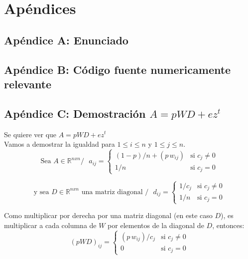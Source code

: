 \section{Apéndices}

	\subsection{Apéndice A: Enunciado}

	\subsection{Apéndice B: Código fuente numericamente relevante}
	\clearpage

	\subsection{Apéndice C: Demostración $A = pWD + ez^{t}$}

		Se quiere ver que $A = pWD + e z^{t}$ \\

		Vamos a demostrar la igualdad para $1 \leq i \leq n$ y $1 \leq j \leq n$. \\

		\[ \text{Sea $A \in \mathbb{R}^{nxn} /$ } a_{ij} =
		        \begin{cases}
		                (1-p)/n + (p \, w_{ij})         & \text{si } c_{j}  \neq 0 \\
		                1    /n                         & \text{si } c_{j}   =   0
		        \end{cases}
		\]

		\[ \text{y sea $D \in \mathbb{R}^{nxn}$ una matriz diagonal $/$ } d_{ij} =
		        \begin{cases}
		                1/c_j         & \text{si } c_{j}  \neq 0 \\
		                1/n           & \text{si } c_{j}   =   0
		        \end{cases}
		\]

		Como multiplicar por derecha por una matriz diagonal (en este caso $D$), es multiplicar a cada columna de $W$ por elementos de la diagonal de $D$, entonces: \\

		\[ (pWD)_{ij} =
		        \begin{cases}
		                (p \, w_{ij})/c_j 	& \text{si } c_{j}  \neq 0 \\
		                0 			& \text{si } c_{j}   =   0
		        \end{cases}
		\]

